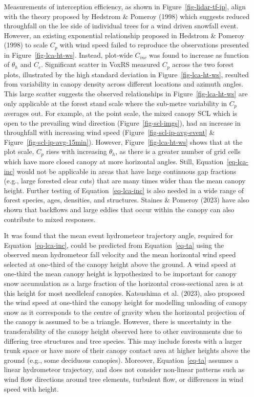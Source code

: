 \documentclass[
  letterpaper,
  DIV=11,
  numbers=noendperiod]{scrartcl}
\begin{document}
Measurements of interception efficiency, as shown in
Figure~\ref{fig-lidar-tf-ip}, align with the theory proposed by Hedstrom
\& Pomeroy (1998) which suggests reduced throughfall on the lee side of
individual trees for a wind driven snowfall event. However, an existing
exponential relationship proposed in Hedstrom \& Pomeroy (1998) to scale
\(C_p\) with wind speed failed to reproduce the observations presented
in Figure~\ref{fig-lca-ht-ws}. Instead, plot-wide \(C_{inc}\) was found
to increase as function of \(\theta_h\) and \(C_c\). Significant scatter
in VoxRS measured \(C_p\) across the two forest plots, illustrated by
the high standard deviation in Figure~\ref{fig-lca-ht-ws}, resulted from
variability in canopy density across different locations and azimuth
angles. This large scatter suggests the observed relationships in
Figure~\ref{fig-lca-ht-ws} are only applicable at the forest stand scale
where the sub-metre variability in \(C_p\) averages out. For example, at
the point scale, the mixed canopy SCL which is open to the prevailing
wind direction (Figure~\ref{fig-scl-imgs}), had an increase in
throughfall with increasing wind speed
(Figure~\ref{fig-scl-ip-avg-event} \&
Figure~\ref{fig-scl-ip-avg-15min}). However, Figure~\ref{fig-lca-ht-ws}
shows that at the plot scale, \(C_p\) rises with increasing
\(\theta_h\), as there is a greater number of grid cells which have more
closed canopy at more horizontal angles. Still,
Equation~\ref{eq-lca-inc} would not be applicable in areas that have
large continuous gap fractions (e.g., large forested clear cuts) that
are many times wider than the mean canopy height. Further testing of
Equation~\ref{eq-lca-inc} is also needed in a wide range of forest
species, ages, densities, and structures. Staines \& Pomeroy (2023) have
also shown that backflows and large eddies that occur within the canopy
can also contribute to mixed responses.

It was found that the mean event hydrometeor trajectory angle, required
for Equation~\ref{eq-lca-inc}, could be predicted from
Equation~\ref{eq-ta} using the observed mean hydrometeor fall velocity
and the mean horizontal wind speed selected at one-third of the canopy
height above the ground. A wind speed at one-third the mean canopy
height is hypothesized to be important for canopy snow accumulation as a
large fraction of the horizontal cross-sectional area is at this height
for most needleleaf canopies. Katsushima et al. (2023), also proposed
the wind speed at one-third the canopy height for modelling unloading of
canopy snow as it corresponds to the centre of gravity when the
horizontal projection of the canopy is assumed to be a triangle.
However, there is uncertainty in the transferability of the canopy
height observed here to other environments due to differing tree
structures and tree species. This may include forests with a larger
trunk space or have more of their canopy contact area at higher heights
above the ground (e.g., some deciduous canopies). Moreover,
Equation~\ref{eq-ta} assumes a linear hydrometeor trajectory, and does
not consider non-linear patterns such as wind flow directions around
tree elements, turbulent flow, or differences in wind speed with height.
\end{document}

